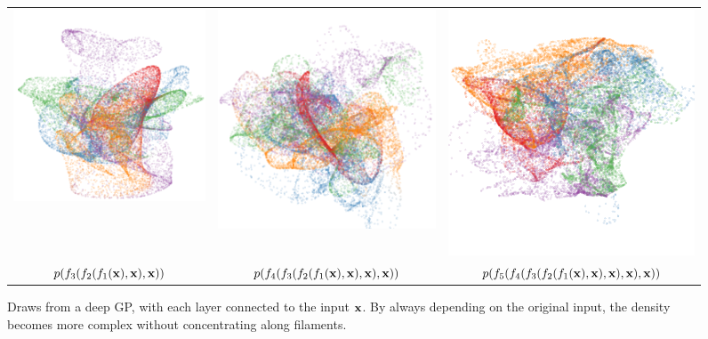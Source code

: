 \documentclass{article}
\begin{document}
\begin{figure}
\centering
\begin{tabular}{ccc}
\includegraphics[width=0.3\columnwidth]{figures/deep_draws_connected/deep_sample_connected_layer4} &
\includegraphics[width=0.3\columnwidth]{figures/deep_draws_connected/deep_sample_connected_layer5} &
\includegraphics[width=0.3\columnwidth]{figures/deep_draws_connected/deep_sample_connected_layer6} \\
$p(f_3(f_2(f_1({\bf{x}}),{\bf{x}}),{\bf{x}}))$ & $p(f_4(f_3(f_2(f_1({\bf{x}}), {\bf{x}}),{\bf{x}}),{\bf{x}}))$ & $p(f_5(f_4(f_3(f_2(f_1({\bf{x}}),{\bf{x}}),{\bf{x}}),{\bf{x}}),{\bf{x}}))$
\end{tabular}
\caption{Draws from a deep GP, with each layer connected to the input ${\bf{x}}$.  By always depending on the original input, the density becomes more complex without concentrating along filaments.}
\label{fig:no_filamentation}
\end{figure}
\end{document}
